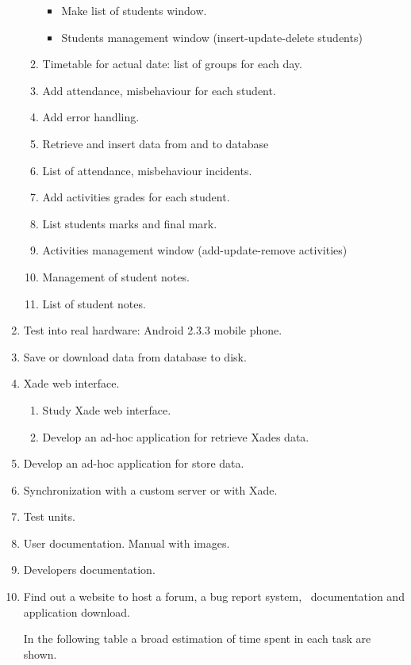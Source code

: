 \documentclass[a4paper]{article}
\begin{document}
\begin{enumerate}
\begin{enumerate}
\begin{itemize}
\item Make list of students window.
\item Students management window (insert-update-delete students)
\end{itemize}
\item Timetable for actual date: list of groups for each day.
\item Add attendance, misbehaviour for each student.
\item Add error handling.
\item Retrieve and insert data from and to database
\item List of attendance, misbehaviour incidents.
\item Add activities grades for each student.
\item List students marks and final mark.
\item Activities management window (add-update-remove activities)
\item Management of student notes.
\item List of student notes. 
\end{enumerate}
\item Test into real hardware: Android 2.3.3 mobile phone.
\item Save or download data from database to disk.
\item Xade web interface.

\begin{enumerate}
\item Study Xade web interface.
\item Develop an ad-hoc application for retrieve Xade{\textquotesingle}s
data. 
\end{enumerate}
\item Develop an ad-hoc application for store data. 
\item Synchronization with a custom server or with Xade.
\item Test units.
\item User documentation. Manual with images.
\item Developer{\textquotesingle}s documentation.
\item Find out a website to host a forum, a bug report system,
\ documentation and application download.

In the following table a broad estimation of time spent in each task are
shown. \ 
\end{enumerate}
\end{document}
